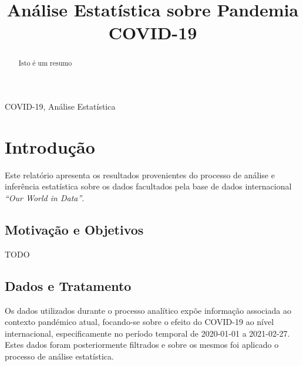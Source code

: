 \documentclass[conference]{IEEEtran}
\begin{document}
\title{Análise Estatística sobre Pandemia COVID-19}

\author{
\and
{}
\and
{}
}

\maketitle

\begin{abstract}
Isto é um resumo
\end{abstract}

\begin{IEEEkeywords}
COVID-19, Análise Estatística
\end{IEEEkeywords}

\section{Introdução}
Este relatório apresenta os resultados provenientes do processo de análise e inferência estatística sobre os dados facultados pela base de dados internacional \textit{``Our World in Data''}\cite{owidcoronavirus}. 

\subsection{Motivação e Objetivos}

TODO

\subsection{Dados e Tratamento}

Os dados utilizados durante o processo analítico expõe informação associada ao contexto pandémico atual, focando-se sobre o efeito do COVID-19 ao nível internacional, especificamente no período temporal de 2020-01-01 a 2021-02-27. Estes dados foram posteriormente filtrados e sobre os mesmos foi aplicado o processo de análise estatística.
\end{document}
